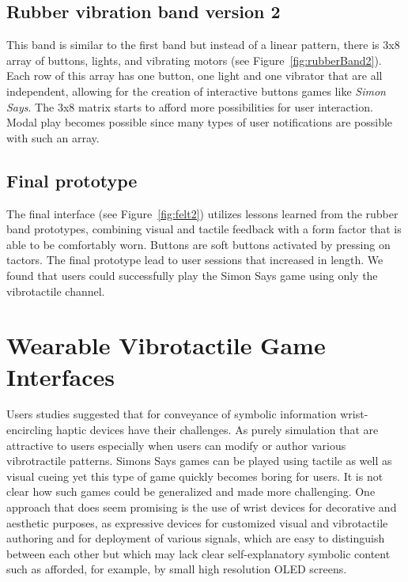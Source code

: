 \documentclass{chi-ext}
\begin{document}
\subsection{Rubber vibration band version 2}
This band is similar to the first band but instead of a linear pattern, there is 3x8 array of buttons, lights, and vibrating motors (see Figure~\ref{fig:rubberBand2}). Each row of this array has one button, one light and one vibrator that are all independent, allowing for the creation of interactive buttons games like \emph{Simon Says}. The 3x8 matrix starts to afford more possibilities for user interaction. Modal play becomes possible since many types of user notifications are possible with such an array. 

\subsection {Final prototype}
The final interface (see Figure~\ref{fig:felt2}) utilizes lessons learned from the rubber band prototypes, combining visual and tactile feedback with a form factor that is able to be comfortably worn. Buttons are soft buttons activated by pressing on tactors. The final prototype lead to user sessions that increased in length. We found that users could successfully play the Simon Says game using only the vibrotactile channel. 


\section{Wearable Vibrotactile Game Interfaces}
Users studies suggested that for conveyance of symbolic information wrist-encircling haptic devices have their challenges. As purely simulation that are attractive to users especially when users can modify or author various vibrotractile patterns. Simons Says games can be played using tactile as well as visual cueing yet this type of game quickly becomes boring for users. It is not clear how such games could be generalized and made more challenging. One approach that does seem promising is the use of wrist devices for decorative and aesthetic purposes, as expressive devices for customized visual and vibrotactile authoring and for deployment of various signals, which are easy to distinguish between each other but which may lack clear self-explanatory symbolic content such as afforded, for example, by small high resolution OLED screens. 
\end{document}
